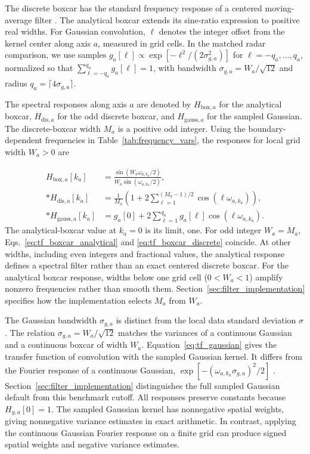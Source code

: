 \documentclass[a4paper,fleqn]{cas-sc}
\begin{document}
The discrete boxcar has the standard frequency response of a centered moving-average filter \citep[Chap.~15]{Smith1997}. The analytical boxcar extends its sine-ratio expression to positive real widths. For Gaussian convolution, $\ell$ denotes the integer offset from the kernel center along axis $a$, measured in grid cells. In the matched radar comparison, we use samples $g_a[\ell]\propto\exp[-\ell^2/(2\sigma_{g,a}^2)]$ for $\ell=-q_a,\ldots,q_a$, normalized so that $\sum_{\ell=-q_a}^{q_a}g_a[\ell]=1$, with bandwidth $\sigma_{g,a}=W_a/\sqrt{12}$ and radius $q_a=\lceil4\sigma_{g,a}\rceil$.

The spectral responses along axis $a$ are denoted by $H_{\mathrm{box},a}$ for the analytical boxcar, $H_{\mathrm{dis},a}$ for the odd discrete boxcar, and $H_{\mathrm{gauss},a}$ for the sampled Gaussian. The discrete-boxcar width $M_a$ is a positive odd integer. Using the boundary-dependent frequencies in Table~\ref{tab:frequency_vars}, the responses for local grid width $W_a>0$ are

\begin{align}
	H_{\mathrm{box},a}[k_a] & = \frac{\sin(W_a\omega_{a,k_a}/2)}{W_a\sin(\omega_{a,k_a}/2)}, \label{eq:tf_boxcar_analytical} \\*
	H_{\mathrm{dis},a}[k_a] & = \frac{1}{M_a}\left(1+2\sum_{\ell=1}^{(M_a-1)/2}\cos(\ell\omega_{a,k_a})\right), \label{eq:tf_boxcar_discrete} \\*
	H_{\mathrm{gauss},a}[k_a] & = g_a[0]+2\sum_{\ell=1}^{q_a}g_a[\ell]\cos(\ell\omega_{a,k_a}). \label{eq:tf_gaussian}
\end{align}
The analytical-boxcar value at $k_a=0$ is its limit, one. For odd integer $W_a=M_a$, Eqs.~\ref{eq:tf_boxcar_analytical} and \ref{eq:tf_boxcar_discrete} coincide. At other widths, including even integers and fractional values, the analytical response defines a spectral filter rather than an exact centered discrete boxcar. For the analytical boxcar response, widths below one grid cell ($0<W_a<1$) amplify nonzero frequencies rather than smooth them. Section~\ref{sec:filter_implementation} specifies how the implementation selects $M_a$ from $W_a$.

The Gaussian bandwidth $\sigma_{g,a}$ is distinct from the local data standard deviation $\sigma$. The relation $\sigma_{g,a}=W_a/\sqrt{12}$ matches the variances of a continuous Gaussian and a continuous boxcar of width $W_a$. Equation~\ref{eq:tf_gaussian} gives the transfer function of convolution with the sampled Gaussian kernel. It differs from the Fourier response of a continuous Gaussian, $\exp[-(\omega_{a,k_a}\sigma_{g,a})^2/2]$ \citep[Chap.~11]{Smith1997}. Section~\ref{sec:filter_implementation} distinguishes the full sampled Gaussian default from this benchmark cutoff. All responses preserve constants because $H_{g,a}[0]=1$. The sampled Gaussian kernel has nonnegative spatial weights, giving nonnegative variance estimates in exact arithmetic. In contrast, applying the continuous Gaussian Fourier response on a finite grid can produce signed spatial weights and negative variance estimates.
\end{document}
